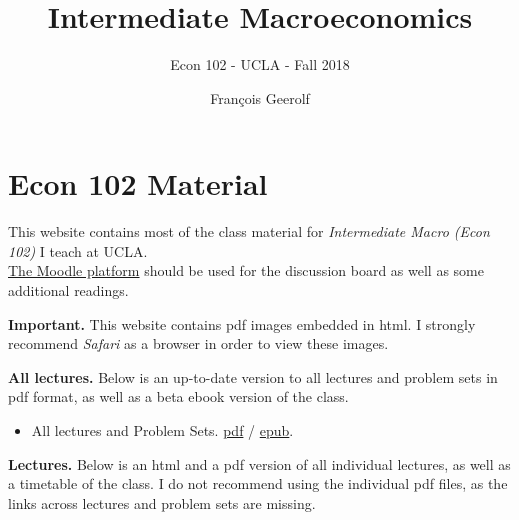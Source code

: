 \documentclass[]{book}
\title{Intermediate Macroeconomics}
\subtitle{Econ 102 - UCLA - Fall 2018}
\author{François Geerolf}
\date{}
\providecommand{\tightlist}{%
  \setlength{\itemsep}{0pt}\setlength{\parskip}{0pt}}
\begin{document}
\maketitle

{
\setcounter{tocdepth}{2}
\tableofcontents
}
\listoftables
\listoffigures
\chapter*{Econ 102 Material}\label{econ-102-material}

This website contains most of the class material for \emph{Intermediate
Macro (Econ 102)} I teach at UCLA.\\
\href{https://moodle2.sscnet.ucla.edu/course/view/18F-ECON102-1}{The
Moodle platform} should be used for the discussion board as well as some
additional readings.

\textbf{Important.} This website contains pdf images embedded in html. I
strongly recommend \emph{Safari} as a browser in order to view these
images.

\textbf{All lectures.} Below is an up-to-date version to all lectures
and problem sets in pdf format, as well as a beta ebook version of the
class.

\begin{itemize}
\tightlist
\item
  All lectures and Problem Sets.
  \href{econ102-ucla-2018F-geerolf.pdf}{pdf} /
  \href{econ102-ucla-2018F-geerolf.epub}{epub}.
\end{itemize}

\textbf{Lectures.} Below is an html and a pdf version of all individual
lectures, as well as a timetable of the class. I do not recommend using
the individual pdf files, as the links across lectures and problem sets
are missing.
\end{document}
